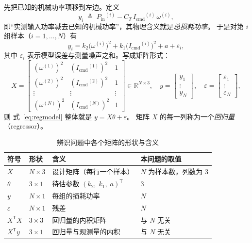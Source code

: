 \documentclass[cn,blue,11pt,device=normal]{elegantnote}
\newcommand{\Pin}{P_{\mathrm{in}}{}}
\newcommand{\Icmd}{I_{\mathrm{cmd}}{}}
\newcommand{\CT}{C_{T}{}}
\newcommand{\fref}[1]{式~\eqref{#1}}
\begin{document}
先把已知的机械功率项移到左边。定义
\begin{equation}
  y_i \;\triangleq\; \Pin^{(i)} - \CT\,\Icmd^{(i)}\,\omega^{(i)},
\end{equation}
即“实测输入功率减去已知的机械功率”，其物理含义就是\emph{总损耗功率}。
于是对第 $i$ 组样本（$i=1,\dots,N$）有
\begin{equation}\label{eq:regmodel}
  y_i = k_2\bigl(\omega^{(i)}\bigr)^2 + k_1\bigl(\Icmd^{(i)}\bigr)^2 + a + \varepsilon_i ,
\end{equation}
其中 $\varepsilon_i$ 表示模型误差与测量噪声之和。写成矩阵形式：
\begin{equation}\label{eq:designmat}
  X = \begin{bmatrix}
    (\omega^{(1)})^2 & (\Icmd^{(1)})^2 & 1\\[2pt]
    (\omega^{(2)})^2 & (\Icmd^{(2)})^2 & 1\\[2pt]
    \vdots & \vdots & \vdots\\[2pt]
    (\omega^{(N)})^2 & (\Icmd^{(N)})^2 & 1
  \end{bmatrix}\in\mathbb{R}^{N\times 3},
  \quad
  y=\begin{bmatrix} y_1\\ \vdots\\ y_N\end{bmatrix},
  \quad
  \varepsilon=\begin{bmatrix} \varepsilon_1\\ \vdots\\ \varepsilon_N\end{bmatrix},
\end{equation}
则 \fref{eq:regmodel} 整体就是 $y = X\theta + \varepsilon$。
矩阵 $X$ 的每一列称为一个\emph{回归量}（regressor）。

\begin{table}[htbp]
  \centering
  \small
  \caption{辨识问题中各个矩阵的形状与含义}
  \label{tab:matrixshape}
  \begin{tabular}{@{}llll@{}}
    \toprule
    符号 & 形状 & 含义 & 本问题的取值 \\
    \midrule
    $X$            & $N\times 3$ & 设计矩阵（每行一个样本） & $N$ 为样本数，列数为 $3$ \\
    $\theta$       & $3\times 1$ & 待估参数 $(k_2,\;k_1,\;a)^{\mathsf T}$ & $3$ \\
    $y$            & $N\times 1$ & 每组的损耗功率 & $N$ \\
    $\varepsilon$  & $N\times 1$ & 残差 & $N$ \\
    $X^{\mathsf T}X$ & $3\times 3$ & 回归量的内积矩阵 & 与 $N$ 无关 \\
    $X^{\mathsf T}y$ & $3\times 1$ & 回归量与观测量的内积 & 与 $N$ 无关 \\
    \bottomrule
  \end{tabular}
\end{table}
\end{document}
